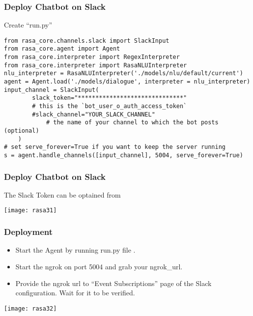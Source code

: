 \begin{frame}[fragile]\frametitle{Deploy Chatbot on Slack}
Create ``run.py''
\begin{lstlisting}
from rasa_core.channels.slack import SlackInput
from rasa_core.agent import Agent
from rasa_core.interpreter import RegexInterpreter
from rasa_core.interpreter import RasaNLUInterpreter
nlu_interpreter = RasaNLUInterpreter('./models/nlu/default/current')
agent = Agent.load('./models/dialogue', interpreter = nlu_interpreter)
input_channel = SlackInput(
        slack_token="******************************"
        # this is the `bot_user_o_auth_access_token`
        #slack_channel="YOUR_SLACK_CHANNEL"
            # the name of your channel to which the bot posts (optional)
    )
# set serve_forever=True if you want to keep the server running
s = agent.handle_channels([input_channel], 5004, serve_forever=True)
\end{lstlisting}

\end{frame}

\begin{frame}[fragile]\frametitle{Deploy Chatbot on Slack}
The Slack Token can be optained from


\begin{center}
\texttt{[image: rasa31]}
\end{center}
\end{frame}


\begin{frame}[fragile]\frametitle{Deployment}
\begin{itemize}
\item Start the Agent by running run.py file .
\item Start the ngrok on port 5004 and grab your ngrok\_url.
\item Provide the ngrok url to ``Event Subscriptions'' page of the Slack configuration. Wait for it to be verified.
\end{itemize}

\begin{center}
\texttt{[image: rasa32]}
\end{center}
\end{frame}


